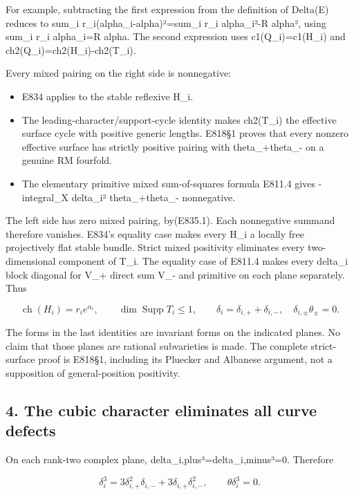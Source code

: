 For example, subtracting the first expression from the definition of
Delta(E) reduces to sum\_i r\_i(alpha\_i-alpha)²=sum\_i r\_i alpha\_i²-R
alpha², using sum\_i r\_i alpha\_i=R alpha. The second expression uses
c1(Q\_i)=c1(H\_i) and ch2(Q\_i)=ch2(H\_i)-ch2(T\_i).

Every mixed pairing on the right side is nonnegative:

\begin{itemize}
\item
  E834 applies to the stable reflexive H\_i.
\item
  The leading-character/support-cycle identity makes ch2(T\_i) the
  effective surface cycle with positive generic lengths. E818§1 proves
  that every nonzero effective surface has strictly positive pairing
  with theta\_+theta\_- on a genuine RM fourfold.
\item
  The elementary primitive mixed sum-of-squares formula E811.4 gives
  -integral\_X delta\_i² theta\_+theta\_- nonnegative.
\end{itemize}

The left side has zero mixed pairing, by(E835.1). Each nonnegative
summand therefore vanishes. E834's equality case makes every H\_i a
locally free projectively flat stable bundle. Strict mixed positivity
eliminates every two-dimensional component of T\_i. The equality case of
E811.4 makes every delta\_i block diagonal for V\_+ direct sum V\_- and
primitive on each plane separately. Thus

\[
 \operatorname{ch}(H_i)=r_i e^{\alpha_i},\qquad
 \dim\operatorname{Supp}T_i\le1,
 \qquad \delta_i=\delta_{i,+}+\delta_{i,-},\quad
 \delta_{i,\pm}\theta_\pm=0.
 \tag{E835.5}
\]

The forms in the last identities are invariant forms on the indicated
planes. No claim that those planes are rational subvarieties is made.
The complete strict-surface proof is E818§1, including its Pluecker and
Albanese argument, not a supposition of general-position positivity.

\subsection{4. The cubic character eliminates all curve
defects}\label{SF-E835:the-cubic-character-eliminates-all-curve-defects}

On each rank-two complex plane, delta\_i,plus³=delta\_i,minus³=0.
Therefore

\[
 \delta_i^3=3\delta_{i,+}^2\delta_{i,-}
                 +3\delta_{i,+}\delta_{i,-}^2,
 \qquad \theta\delta_i^3=0.
 \tag{E835.6}
\]

